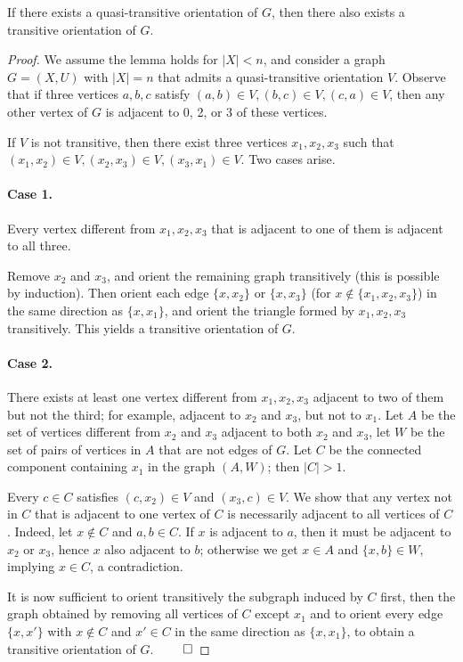 \documentclass[10pt,a4paper]{amsart}
\begin{document}
\begin{lemma}
If there exists a quasi-transitive orientation of $G$, then there also exists a transitive orientation of $G$.
\end{lemma}

\begin{proof}
We assume the lemma holds for $|X| < n$, and consider a graph $G = (X,U)$ with $|X| = n$ that admits a quasi-transitive orientation $V$. Observe that if three vertices $a,b,c$ satisfy $(a,b) \in V, (b,c) \in V, (c,a) \in V$, then any other vertex of $G$ is adjacent to 0, 2, or 3 of these vertices.

If $V$ is not transitive, then there exist three vertices $x_1, x_2, x_3$ such that $(x_1,x_2) \in V,(x_2,x_3) \in V,(x_3,x_1) \in V$. Two cases arise.

\paragraph{Case 1.}
Every vertex different from $x_1,x_2,x_3$ that is adjacent to one of them is adjacent to all three.

Remove $x_2$ and $x_3$, and orient the remaining graph transitively (this is possible by induction). Then orient each edge $\{x,x_2\}$ or $\{x,x_3\}$ (for $x \notin \{x_1,x_2,x_3\}$) in the same direction as $\{x,x_1\}$, and orient the triangle formed by $x_1,x_2,x_3$ transitively. This yields a transitive orientation of $G$.

\paragraph{Case 2.}
There exists at least one vertex different from $x_1,x_2,x_3$ adjacent to two of them but not the third; for example, adjacent to $x_2$ and $x_3$, but not to $x_1$. Let $A$ be the set of vertices different from $x_2$ and $x_3$ adjacent to both $x_2$ and $x_3$, let $W$ be the set of pairs of vertices in $A$ that are not edges of $G$. Let $C$ be the connected component containing $x_1$ in the graph $(A,W)$; then $|C| > 1$.

Every $c \in C$ satisfies $(c,x_2) \in V $ and $(x_3,c) \in V$. We show that any vertex not in $C$ that is adjacent to one vertex of $C$ is necessarily adjacent to all vertices of $C$. Indeed, let $x \notin C$ and $a,b \in C$. If $x$ is adjacent to $a$, then it must be adjacent to $x_2$ or $x_3$, hence $x$ also adjacent to $b$; otherwise we get $x \in A$ and $\{x,b\} \in W$, implying $x \in C$, a contradiction.

It is now sufficient to orient transitively the subgraph induced by $C$ first, then the graph obtained by removing all vertices of $C$ except $x_1$ and to orient every edge $\{x,x'\}$ with $x \notin C$ and $x' \in C$ in the same direction as $\{x,x_1\}$, to obtain a transitive orientation of $G$.
$\qed$\end{proof}
\end{document}
